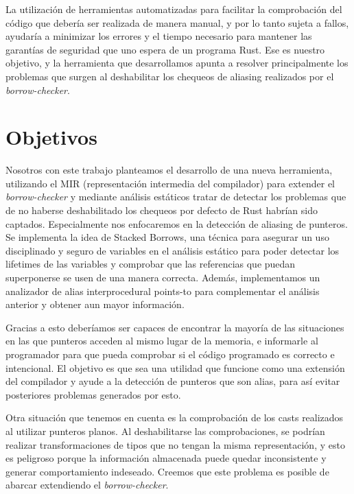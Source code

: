 La utilización de herramientas automatizadas para facilitar la comprobación del código que debería ser realizada de manera manual, y por lo tanto sujeta a fallos, ayudaría a minimizar los errores y el tiempo necesario para mantener las garantías de seguridad que uno espera de un programa Rust. Ese es nuestro objetivo, y la herramienta que desarrollamos apunta a resolver principalmente los problemas que surgen al deshabilitar los chequeos de aliasing realizados por el \textit{borrow-checker}.


\section{Objetivos}

Nosotros con este trabajo planteamos el desarrollo de una nueva herramienta, utilizando el MIR (representación intermedia del compilador) para extender el \textit{borrow-checker} y mediante análisis estáticos tratar de detectar los problemas que de no haberse deshabilitado los chequeos por defecto de Rust habrían sido captados. Especialmente nos enfocaremos en la detección de aliasing de punteros. Se implementa la idea de Stacked Borrows, una técnica para asegurar un uso disciplinado y seguro de variables en el análisis estático para poder detectar los lifetimes de las variables y comprobar que las referencias que puedan superponerse se usen de una manera correcta. Además, implementamos un analizador de alias interprocedural points-to \cite{interprocedural} \cite{fastaliasinganalisis} para complementar el análisis anterior y obtener aun mayor información.

Gracias a esto deberíamos ser capaces de encontrar la mayoría de las situaciones en las que punteros acceden al mismo lugar de la memoria, e informarle al programador para que pueda comprobar si el código programado es correcto e intencional. El objetivo es que sea una utilidad que funcione como una extensión del compilador y ayude a la detección de punteros que son alias, para así evitar posteriores problemas generados por esto.

Otra situación que tenemos en cuenta es la comprobación de los casts realizados al utilizar punteros planos. Al deshabilitarse las comprobaciones, se podrían realizar transformaciones de tipos que no tengan la misma representación, y esto es peligroso porque la información almacenada puede quedar inconsistente y generar comportamiento indeseado.
Creemos que este problema es posible de abarcar extendiendo el \textit{borrow-checker}.

